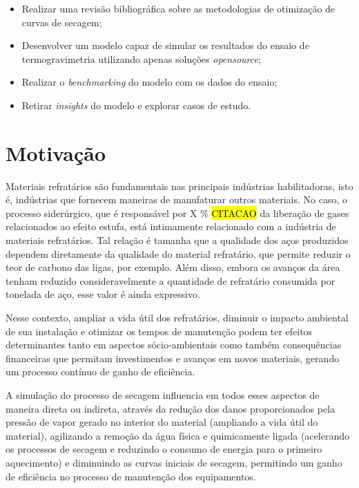     \begin{itemize}
        \item Realizar uma revisão bibliográfica sobre as metodologias de otimização de curvas de secagem;
        
        \item Desenvolver um modelo capaz de simular os resultados do ensaio de termogravimetria utilizando apenas soluções \textit{opensource};
        
        \item Realizar o \textit{benchmarking} do modelo com os dados do ensaio;
        
        \item Retirar \textit{insights} do modelo e explorar casos de estudo.
    \end{itemize}
        
\section{Motivação}
   Materiais refratários são fundamentais nas principais indústrias
   habilitadoras, isto é, indústrias que fornecem maneiras de manufaturar outros
   materiais. No caso, o processo siderúrgico, que é responsável por X \% \hl{CITACAO} da
   liberação de gases relacionados ao efeito estufa, está intimamente relacionado com a
   indústria de materiais refratários. Tal relação é tamanha que a qualidade dos
   aços produzidos dependem diretamente da qualidade do material refratário, que
   permite reduzir  o teor de carbono das ligas, por exemplo. Além disso, embora os avanços da
   área tenham reduzido consideravelmente a quantidade de refratário consumida
   por tonelada de aço, esse valor é ainda expressivo.

   Nesse contexto, ampliar a vida útil dos refratários, diminuir o impacto
   ambiental de sua instalação e otimizar os tempos de manutenção podem ter
   efeitos determinantes tanto em aspectos sócio-ambientais como também
   consequências financeiras que permitam investimentos e avanços em novos
   materiais, gerando um processo contínuo de ganho de eficiência.

   A simulação do processo de secagem influencia em todos esses aspectos de
   maneira direta ou indireta, através da redução dos danos proporcionados pela
   pressão de vapor gerado no interior do material (ampliando a vida útil do
   material), agilizando a remoção da água física e quimicamente ligada
   (acelerando os processos de secagem e reduzindo o consumo de energia para o
   primeiro aquecimento) e diminuindo as curvas iniciais de secagem, permitindo
   um ganho de eficiência no processo de manutenção dos equipamentos.

